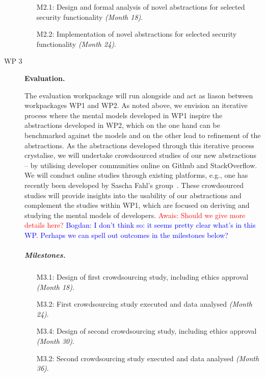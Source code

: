 \documentclass[10pt]{article}
\newcommand{\bw}[1]{{\textcolor{blue} {Bogdan: #1}}}
\newcommand{\ar}[1]{{\textcolor{red} {Awais: #1}}}
\begin{document}
\begin{description}
\begin{itemize}
\item[M2.1:] Design and formal analysis of novel abstractions for selected security functionality \textit{(Month 18)}.

\item[M2.2:] Implementation of novel abstractions for selected security functionality \textit{(Month 24)}.

\end{itemize}

\vspace{.3cm}

\item[WP 3] \textbf{Evaluation.}

The evaluation workpackage will run alongside and act as liason between workpackages WP1 and WP2.  
As noted above, we envision an iterative process where the mental models developed in WP1 inspire the abstractions developed in WP2, which on the one hand can be benchmarked against the models and on the other lead to refinement of the abstractions. As the abstractions developed through this iterative process crystalise, we will undertake crowdsourced studies of our new abstractions -- by utilising developer communities online on Github and StackOverflow. We will conduct online studies through existing platforms, e.g., one has recently been developed by Sascha Fahl's group~\cite{stransky2017}. These crowdsourced studies will provide insights into the usability of our abstractions and complement the studies within WP1, which are focused on deriving and studying the mental models of developers. \ar{Should we give more details here?}
\bw{I don't think so: it seems pretty clear what's in this WP. Perhaps we can spell out outcomes in the milestones below? }

\vspace{-\baselineskip}
\subparagraph{Milestones.}

\begin{itemize}

\item[M3.1:] Design of first crowdsourcing study, including ethics approval \textit{(Month 18)}.

\item[M3.2:] First crowdsourcing study executed and data analysed \textit{(Month 24)}.

\item[M3.4:] Design of second crowdsourcing study, including ethics approval \textit{(Month 30)}.

\item[M3.2:] Second crowdsourcing study executed and data analysed \textit{(Month 36)}.

\end{itemize}


\end{description}
\end{document}

